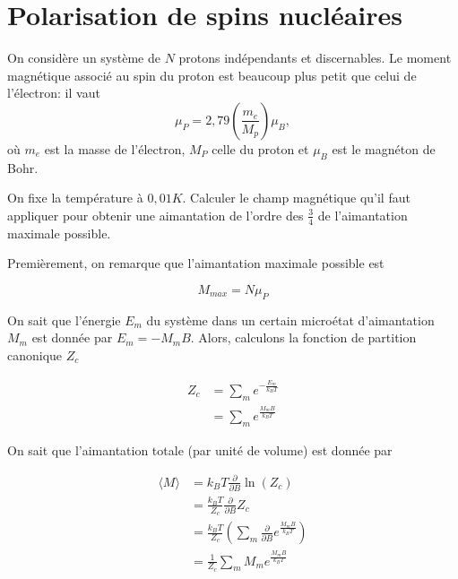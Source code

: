 \documentclass[french]{article}
\begin{document}
	\section{Polarisation de spins nucléaires}
	\begin{tcolorbox}[colback=blue!5!white,colframe=blue!75!black]
	\quad On considère un système de $N$ protons indépendants et discernables. Le moment magnétique associé au spin du proton est beaucoup plus petit que celui de l'électron: il vaut $$\mu_P = 2,79\left(\frac{m_e}{M_p}\right)\mu_B,$$ où $m_e$ est la masse de l'électron, $M_P$ celle du proton et $\mu_B$ est le magnéton de Bohr.
	
	\quad On fixe la température à $0,01K$. Calculer le champ magnétique qu'il faut appliquer pour obtenir une aimantation de l'ordre des $\frac{3}{4}$ de l'aimantation maximale possible.
	\end{tcolorbox}

	Premièrement, on remarque que l'aimantation maximale possible est 
	
	$$ M_{max} = N\mu_P $$

	On sait que l'énergie $E_m$ du système dans un certain microétat d'aimantation $M_m$ est donnée par $ E_m = - M_m B $. Alors, calculons la fonction de partition canonique $Z_c$
	
	\begin{align}
		Z_c &= \sum_{m} e^{-\frac{E_m}{k_B T}} \\
		&= \sum_{m} e^{\frac{M_m B}{k_B T}}
	\end{align}

	On sait que l'aimantation totale (par unité de volume) est donnée par
	
	\begin{align}
		\langle M \rangle &= k_B T \frac{\partial}{\partial B} \ln(Z_c) \\
		&= \frac{k_B T}{Z_c} \frac{\partial}{\partial B} Z_c \\
		&= \frac{k_B T}{Z_c} \left( \sum_{m} \frac{\partial}{\partial B}  e^{\frac{M_m B}{k_B T}} \right) \\
		&= \frac{1}{Z_c} \sum_{m} M_m e^{\frac{M_m B}{k_B T}}
	\end{align}
	
\end{document}
